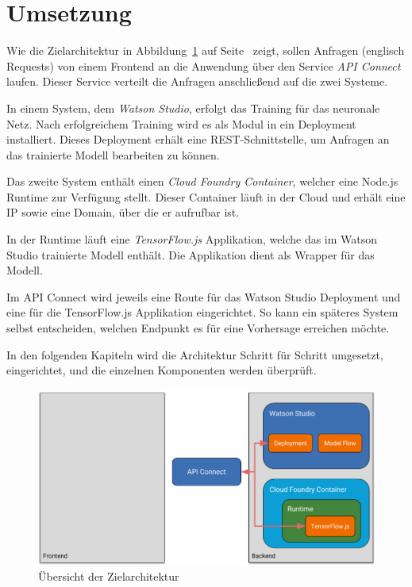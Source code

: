 \section{Umsetzung}
Wie die Zielarchitektur in Abbildung~\ref{fig:umsetzung_zielarchitektur} auf
Seite~\pageref{fig:umsetzung_zielarchitektur} zeigt, sollen Anfragen (englisch Requests) von einem Frontend an die
Anwendung über den Service \textit{API Connect} laufen. Dieser Service verteilt die Anfragen anschließend auf die zwei
Systeme.

In einem System, dem \textit{Watson Studio}, erfolgt das Training für das neuronale Netz. Nach erfolgreichem Training
wird es als Modul in ein Deployment installiert. Dieses Deployment erhält eine REST-Schnittstelle, um Anfragen an das
trainierte Modell bearbeiten zu können.

Das zweite System enthält einen \textit{Cloud Foundry Container}, welcher eine Node.js Runtime zur Verfügung stellt.
Dieser Container läuft in der Cloud und erhält eine IP sowie eine Domain, über die er aufrufbar ist.

In der Runtime läuft eine \textit{TensorFlow.js} Applikation, welche das im Watson Studio trainierte Modell enthält. Die
Applikation dient als Wrapper für das Modell.

Im API Connect wird jeweils eine Route für das Watson Studio Deployment und eine für die TensorFlow.js Applikation
eingerichtet. So kann ein späteres System selbst entscheiden, welchen Endpunkt es für eine Vorhersage erreichen möchte.

In den folgenden Kapiteln wird die Architektur Schritt für Schritt umgesetzt, eingerichtet, und die einzelnen
Komponenten werden überprüft.

\begin{figure}[h]
    \centering
    \includegraphics[width=\textwidth]{images/kapitel_3/architektur_uebersicht.pdf}
    \caption{Übersicht der Zielarchitektur}
    \label{fig:umsetzung_zielarchitektur}
\end{figure}

